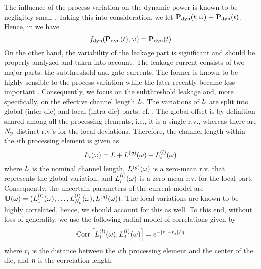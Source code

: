 The influence of the process variation on the dynamic power is known to be negligibly small \cite{juan2012, srivastava2010}. Taking this into consideration, we let $\mathbf{P}_{\text{dyn}}(t, \omega) \equiv \mathbf{P}_{\text{dyn}}(t)$. Hence, in  we have
\[
  f_{\text{dyn}}(\mathbf{P}_{\text{dyn}}(t), \omega) = \mathbf{P}_{\text{dyn}}(t)
\]
On the other hand, the variability of the leakage part is significant and should be properly analyzed and taken into account. The leakage current consists of two major parts: the subthreshold and gate currents. The former is known to be highly sensible to the process variation while the later recently became less important \cite{juan2012}. Consequently, we focus on the subthreshold leakage and, more specifically, on the effective channel length $L$. The variations of $L$ are split into global (inter-die) and local (intra-die) parts, cf. \cite{juan2012, srivastava2010, shen2009}. The global offset is by definition shared among all the processing elements, i.e., it is a single r.v., whereas there are ${N_\text{p}}$ distinct r.v.'s for the local deviations. Therefore, the channel length within the $i$th processing element is given as
\[
  L_i(\omega) = L + {L^{(g)}}(\omega) + L^{(l)}_i(\omega)
\]
where $L$ is the nominal channel length, ${L^{(g)}}(\omega)$ is a zero-mean r.v. that represents the global variation, and $L^{(l)}_i(\omega)$ is a zero-mean r.v. for the local part. Consequently, the uncertain parameters of the current model are $\mathbf{U}(\omega) = (L^{(l)}_1(\omega), \dotsc, L^{(l)}_{N_\text{p}}(\omega), {L^{(g)}}(\omega) )$. The local variations are known to be highly correlated, hence, we should account for this as well. To this end, without loss of generality, we use the following radial model of correlations \cite{ghanem1991} given by
\begin{equation} \elabel{correlation-matrix}
  \oCorr{\lLeff_i(\o), \lLeff_j(\o)} = e^{-|r_i - r_j|/\corrLength}
\end{equation}
where $r_i$ is the distance between the $i$th processing element and the center of the die, and $\eta$ is the correlation length.

